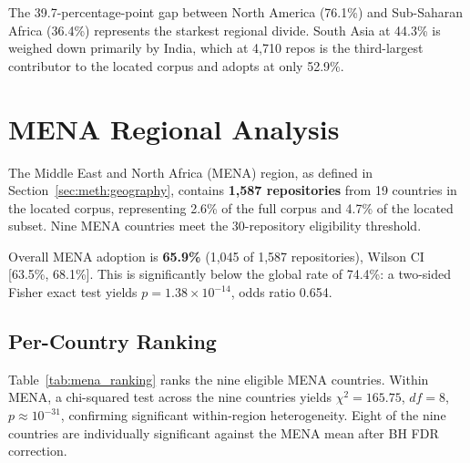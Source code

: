 The 39.7-percentage-point gap between North America (76.1\%) and Sub-Saharan Africa (36.4\%) represents the starkest regional divide. South Asia at 44.3\% is weighed down primarily by India, which at 4,710 repos is the third-largest contributor to the located corpus and adopts at only 52.9\%.

\section{MENA Regional Analysis}
\label{sec:res:mena}

The Middle East and North Africa (MENA) region, as defined in Section~\ref{sec:meth:geography}, contains \textbf{1,587 repositories} from 19 countries in the located corpus, representing 2.6\% of the full corpus and 4.7\% of the located subset. Nine MENA countries meet the 30-repository eligibility threshold.

Overall MENA adoption is \textbf{65.9\%} (1,045 of 1,587 repositories), Wilson CI [63.5\%, 68.1\%]. This is significantly below the global rate of 74.4\%: a two-sided Fisher exact test yields $p = 1.38 \times 10^{-14}$, odds ratio 0.654.

\subsection{Per-Country Ranking}

Table~\ref{tab:mena_ranking} ranks the nine eligible MENA countries. Within MENA, a chi-squared test across the nine countries yields $\chi^2 = 165.75$, $df = 8$, $p \approx 10^{-31}$, confirming significant within-region heterogeneity. Eight of the nine countries are individually significant against the MENA mean after BH FDR correction.

